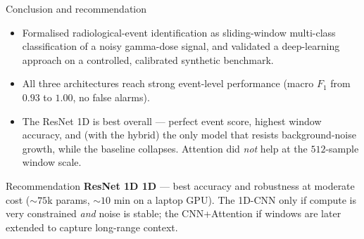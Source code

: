 \documentclass[11pt, aspectratio=169]{beamer}
\newcommand{\dCNN}{1D-CNN}
\newcommand{\dResNet}{ResNet 1D}
\newcommand{\dAttn}{CNN+Attention}
\begin{document}
\begin{frame}{Conclusion and recommendation}
  \begin{itemize}
    \item Formalised radiological-event identification as \alert{sliding-window
          multi-class classification} of a noisy gamma-dose signal, and validated
          a deep-learning approach on a controlled, calibrated synthetic
          benchmark.
    \item All three architectures reach strong event-level performance (macro
          $F_1$ from $0.93$ to $1.00$, no false alarms).
    \item The \dResNet{} is best overall --- perfect event score, highest window
          accuracy, and (with the hybrid) the only model that resists
          background-noise growth, while the baseline collapses. Attention did
          \emph{not} help at the $512$-sample window scale.
  \end{itemize}
  \begin{block}{Recommendation}
    \textbf{\dResNet{} 1D} --- best accuracy and robustness at moderate cost
    ($\sim 75$k params, $\sim 10$ min on a laptop GPU). The \dCNN{} only if
    compute is very constrained \emph{and} noise is stable; the \dAttn{} if
    windows are later extended to capture long-range context.
  \end{block}
\end{frame}
\end{document}
